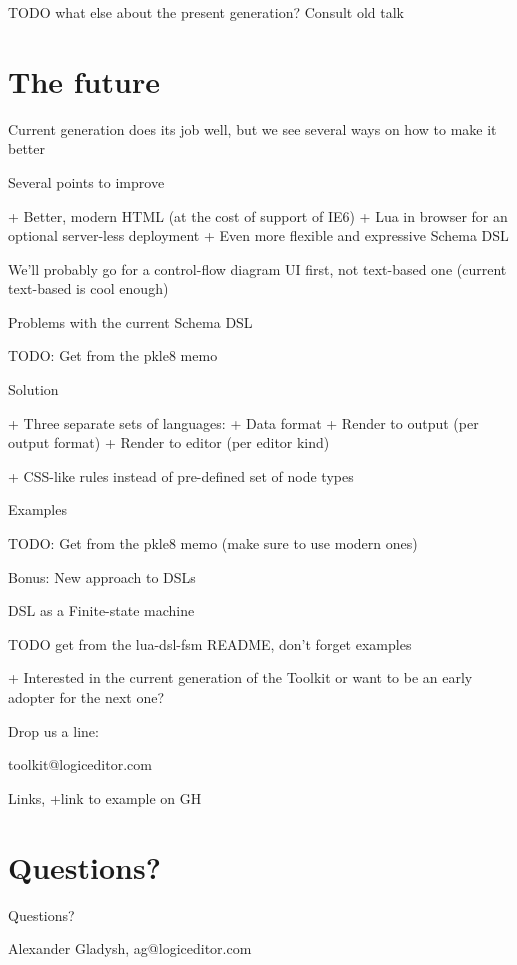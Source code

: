 \documentclass[handout]{beamer}
\begin{document}
TODO what else about the present generation? Consult old talk

\section{The future}

Current generation does its job well, but we see several ways on how to make it better

Several points to improve

+ Better, modern HTML (at the cost of support of IE6)
+ Lua in browser for an optional server-less deployment
+ Even more flexible and expressive Schema DSL

We'll probably go for a control-flow diagram UI first, not text-based one (current text-based is cool enough)

Problems with the current Schema DSL

TODO: Get from the pkle8 memo

Solution

+ Three separate sets of languages:
+ Data format
+ Render to output (per output format)
+ Render to editor (per editor kind)

+ CSS-like rules instead of pre-defined set of node types

Examples

TODO: Get from the pkle8 memo (make sure to use modern ones)

Bonus: New approach to DSLs

DSL as a Finite-state machine

TODO get from the lua-dsl-fsm README, don't forget examples



+ Interested in the current generation of the Toolkit or want to be an early adopter for the next one?

Drop us a line:

toolkit@logiceditor.com


Links, +link to example on GH


\section{Questions?}


\begin{frame}{Questions?}

Alexander Gladysh,
ag@logiceditor.com

\end{frame}

\end{document}
